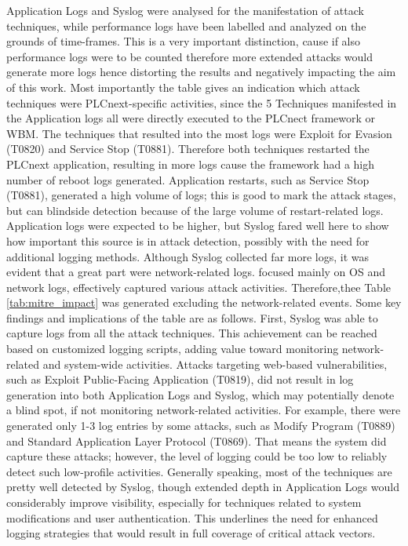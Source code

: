 \documentclass[Master,BMR,english]{twbook}
\begin{document}
Application Logs and Syslog were analysed for the manifestation of attack techniques, while performance logs have been labelled and analyzed on the grounds of time-frames. This is a very important distinction, cause if also performance logs were to be counted therefore more extended attacks would generate more logs hence distorting the results and negatively impacting the aim of this work. Most importantly the table gives an indication which attack techniques were PLCnext-specific activities, since the 5 Techniques manifested in the Application logs all were directly executed to the PLCnect framework or WBM. The techniques that resulted into the most logs were Exploit for Evasion (T0820) and Service Stop (T0881). Therefore both techniques restarted the PLCnext application, resulting in more logs cause the framework had a high number of reboot logs generated. Application restarts, such as Service Stop (T0881), generated a high volume of logs; this is good to mark the attack stages, but can blindside detection because of the large volume of restart-related logs. Application logs were expected to be higher, but Syslog fared well here to show how important this source is in attack detection, possibly with the need for additional logging methods. Although Syslog collected far more logs, it was evident that a great part were network-related logs. focused mainly on OS and network logs, effectively captured various attack activities. Therefore,thee Table \ref{tab:mitre_impact} was generated excluding the network-related events. Some key findings and implications of the table are as follows. First, Syslog was able to capture logs from all the attack techniques. This achievement can be reached based on customized logging scripts, adding value toward monitoring network-related and system-wide activities. Attacks targeting web-based vulnerabilities, such as Exploit Public-Facing Application (T0819), did not result in log generation into both Application Logs and Syslog, which may potentially denote a blind spot, if not monitoring network-related activities. For example, there were generated only 1-3 log entries by some attacks, such as Modify Program (T0889) and Standard Application Layer Protocol (T0869). That means the system did capture these attacks; however, the level of logging could be too low to reliably detect such low-profile activities. Generally speaking, most of the techniques are pretty well detected by Syslog, though extended depth in Application Logs would considerably improve visibility, especially for techniques related to system modifications and user authentication. This underlines the need for enhanced logging strategies that would result in full coverage of critical attack vectors.
\end{document}
